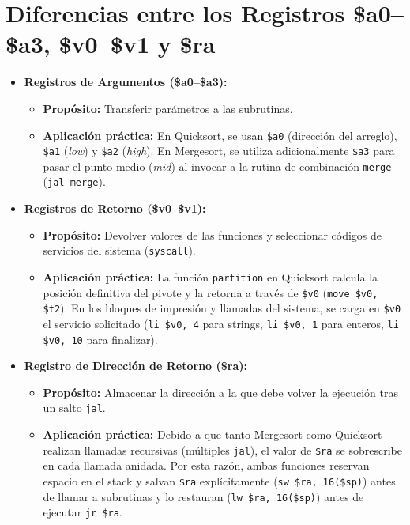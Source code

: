 \documentclass[12pt,a4paper]{article}
\begin{document}
	
	\section{Diferencias entre los Registros \$a0--\$a3, \$v0--\$v1 y \$ra}
	
	\begin{itemize}
		\item \textbf{Registros de Argumentos (\$a0--\$a3):}
		\begin{itemize}
			\item \textbf{Propósito:} Transferir parámetros a las subrutinas.
			\item \textbf{Aplicación práctica:} En Quicksort, se usan \texttt{\$a0} (dirección del arreglo), \texttt{\$a1} (\textit{low}) y \texttt{\$a2} (\textit{high}). En Mergesort, se utiliza adicionalmente \texttt{\$a3} para pasar el punto medio (\textit{mid}) al invocar a la rutina de combinación \texttt{merge} (\texttt{jal merge}).
		\end{itemize}
		\item \textbf{Registros de Retorno (\$v0--\$v1):}
		\begin{itemize}
			\item \textbf{Propósito:} Devolver valores de las funciones y seleccionar códigos de servicios del sistema (\texttt{syscall}).
			\item \textbf{Aplicación práctica:} La función \texttt{partition} en Quicksort calcula la posición definitiva del pivote y la retorna a través de \texttt{\$v0} (\texttt{move \$v0, \$t2}). En los bloques de impresión y llamadas del sistema, se carga en \texttt{\$v0} el servicio solicitado (\texttt{li \$v0, 4} para strings, \texttt{li \$v0, 1} para enteros, \texttt{li \$v0, 10} para finalizar).
		\end{itemize}
		\item \textbf{Registro de Dirección de Retorno (\$ra):}
		\begin{itemize}
			\item \textbf{Propósito:} Almacenar la dirección a la que debe volver la ejecución tras un salto \texttt{jal}.
			\item \textbf{Aplicación práctica:} Debido a que tanto Mergesort como Quicksort realizan llamadas recursivas (múltiples \texttt{jal}), el valor de \texttt{\$ra} se sobrescribe en cada llamada anidada. Por esta razón, ambas funciones reservan espacio en el stack y salvan \texttt{\$ra} explícitamente (\texttt{sw \$ra, 16(\$sp)}) antes de llamar a subrutinas y lo restauran (\texttt{lw \$ra, 16(\$sp)}) antes de ejecutar \texttt{jr \$ra}.
		\end{itemize}
	\end{itemize}
	
\end{document}
